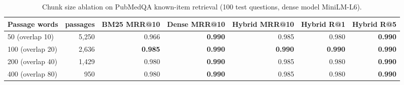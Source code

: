 \begin{table}[t]
\centering\small
\begin{tabular}{lrrrrrr}
\toprule
Passage words & passages & BM25 MRR@10 & Dense MRR@10 & Hybrid MRR@10 & Hybrid R@1 & Hybrid R@5 \\
\midrule
50 (overlap 10) & 5,250 & 0.966 & \textbf{0.990} & 0.985 & 0.980 & \textbf{0.990} \\
100 (overlap 20) & 2,636 & \textbf{0.985} & \textbf{0.990} & \textbf{0.990} & \textbf{0.990} & \textbf{0.990} \\
200 (overlap 40) & 1,429 & 0.980 & \textbf{0.990} & 0.985 & 0.980 & \textbf{0.990} \\
400 (overlap 80) & 950 & 0.980 & \textbf{0.990} & 0.985 & 0.980 & \textbf{0.990} \\
\bottomrule
\end{tabular}
\caption{Chunk size ablation on PubMedQA known-item retrieval (100 test questions, dense model MiniLM-L6).}
\label{tab:ablation_chunk}
\end{table}
